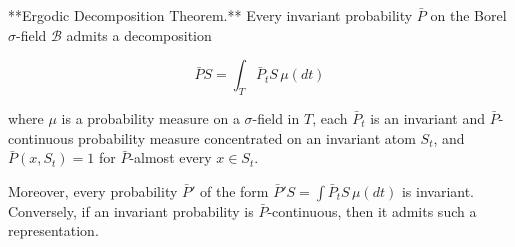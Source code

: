 **Ergodic Decomposition Theorem.** Every invariant probability $\bar{P}$ on the Borel $\sigma$-field $\mathcal{B}$ admits a decomposition

$$\bar{P}S = \int_{T} \bar{P}_t S \, \mu(dt)$$

where $\mu$ is a probability measure on a $\sigma$-field in $T$, each $\bar{P}_t$ is an invariant and $\bar{P}$-continuous probability measure concentrated on an invariant atom $S_t$, and $\bar{P}(x, S_t) = 1$ for $\bar{P}$-almost every $x \in S_t$.

Moreover, every probability $\bar{P}'$ of the form $\bar{P}'S = \int \bar{P}_t S \, \mu(dt)$ is invariant. Conversely, if an invariant probability is $\bar{P}$-continuous, then it admits such a representation.

